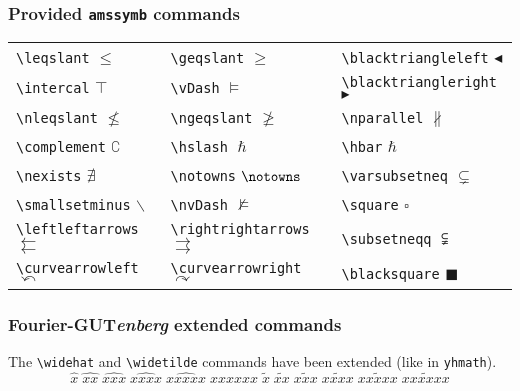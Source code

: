\documentclass[a4paper,11pt]{article}
\newcommand{\fourier}{Fourier-GUT\textit{enberg}}
\begin{document}
\subsubsection*{Provided \texttt{amssymb} commands}

\begin{tabular}{lll}
\verb=\leqslant= $\leqslant$&
\verb=\geqslant= $\geqslant$&
\verb=\blacktriangleleft= $\blacktriangleleft$\\
\verb=\intercal= $\intercal$&
\verb=\vDash= $\vDash$&
\verb=\blacktriangleright= $\blacktriangleright$\\
\verb=\nleqslant= $\nleqslant$&
\verb=\ngeqslant= $\ngeqslant$&
\verb=\nparallel= $\nparallel$\\
\verb=\complement= $\complement$&
\verb=\hslash= $\hslash$&
\verb=\hbar= $\hbar$\\
\verb=\nexists= $\nexists$&
\verb=\notowns= $\notowns$&
\verb=\varsubsetneq= $\varsubsetneq$\\
\verb=\smallsetminus= $\smallsetminus$&
\verb=\nvDash= $\nvDash$&
\verb=\square= $\square$\\
\verb=\leftleftarrows= $\leftleftarrows$&
\verb=\rightrightarrows= $\rightrightarrows$&
\verb=\subsetneqq= $\subsetneqq$\\
\verb=\curvearrowleft= $\curvearrowleft$&
\verb=\curvearrowright= $\curvearrowright$&
\verb=\blacksquare= $\blacksquare$
\end{tabular}
\subsubsection*{\fourier{} extended commands}
The \verb=\widehat= and \verb=\widetilde= commands have been extended (like in \texttt{yhmath}).
\[\widehat{x}\; \widehat{xx} \;\widehat{xxx} \;\widehat{xxxx} 
\;\widehat{xxxxx} \;\widehat{xxxxxx} \;\widetilde{x}\; \widetilde{xx} 
\;\widetilde{xxx} \;\widetilde{xxxx} \;\widetilde{xxxxx} 
\;\widetilde{xxxxxx} \]
\end{document}
